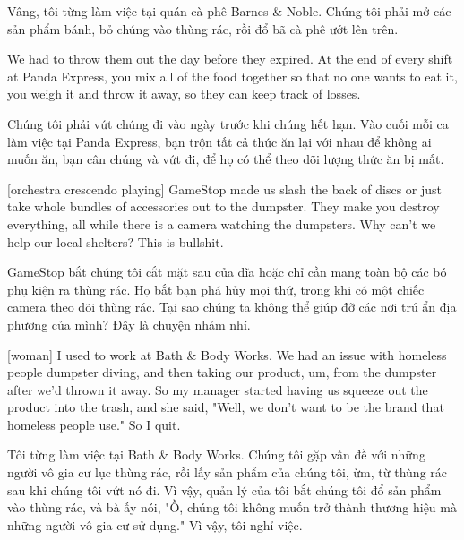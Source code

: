 \documentclass[a4paper]{article}
\begin{document}
	\begin{vietnamese-v2}
		 Vâng, tôi từng làm việc tại quán cà phê Barnes \& Noble.
		Chúng tôi phải mở các sản phẩm bánh, bỏ chúng vào thùng rác, rồi đổ bã cà phê ướt lên trên.
	\end{vietnamese-v2}
	
	We had to throw them out the day before they expired.
	At the end of every shift at Panda Express, you mix all of the food together so that no one wants to eat it, you weigh it and throw it away, so they can keep track of losses.
	
	\begin{vietnamese-v2}
		Chúng tôi phải vứt chúng đi vào ngày trước khi chúng hết hạn.
		Vào cuối mỗi ca làm việc tại Panda Express, bạn trộn tất cả thức ăn lại với nhau để không ai muốn ăn, bạn cân chúng và vứt đi, để họ có thể theo dõi lượng thức ăn bị mất.
	\end{vietnamese-v2}
	
	[orchestra crescendo playing]
	GameStop made us slash the back of discs or just take whole bundles of accessories out to the dumpster.
	They make you destroy everything, all while there is a camera watching the dumpsters.
	Why can't we help our local shelters? This is bullshit.
	
	\begin{vietnamese-v2}
		GameStop bắt chúng tôi cắt mặt sau của đĩa hoặc chỉ cần mang toàn bộ các bó phụ kiện ra thùng rác.
		Họ bắt bạn phá hủy mọi thứ, trong khi có một chiếc camera theo dõi thùng rác.
		Tại sao chúng ta không thể giúp đỡ các nơi trú ẩn địa phương của mình? Đây là chuyện nhảm nhí.
	\end{vietnamese-v2}
	
	[woman] I used to work at Bath \& Body Works.
	We had an issue with homeless people dumpster diving, and then taking our product, um, from the dumpster after we'd thrown it away.
	So my manager started having us squeeze out the product into the trash, and she said, "Well, we don't want to be the brand that homeless people use."
	So I quit.
	
	\begin{vietnamese-v2}
		[phụ nữ] Tôi từng làm việc tại Bath \& Body Works.
		Chúng tôi gặp vấn đề với những người vô gia cư lục thùng rác, rồi lấy sản phẩm của chúng tôi, ừm, từ thùng rác sau khi chúng tôi vứt nó đi.
		Vì vậy, quản lý của tôi bắt chúng tôi đổ sản phẩm vào thùng rác, và bà ấy nói, "Ồ, chúng tôi không muốn trở thành thương hiệu mà những người vô gia cư sử dụng."
		Vì vậy, tôi nghỉ việc.
	\end{vietnamese-v2}
	
\end{document}
